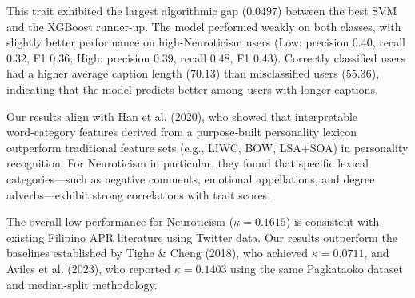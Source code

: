 This trait exhibited the largest algorithmic gap ($0.0497$) between the best SVM 
and the XGBoost runner-up. The model performed weakly on both classes, with slightly better performance on high-Neuroticism users (Low: precision 0.40, recall 0.32, F1 0.36; High: precision 0.39, recall 0.48, F1 0.43).
Correctly classified users had a higher average caption length ($70.13$) than 
misclassified users ($55.36$), indicating that the model predicts better among users with longer captions. 

Our results align with Han et al. (2020), who showed that interpretable word‑category features derived from a purpose‑built personality lexicon outperform traditional feature sets (e.g., LIWC, BOW, LSA+SOA) in personality recognition. For Neuroticism in particular, they found that specific lexical categories—such as negative comments, emotional appellations, and degree adverbs—exhibit strong correlations with trait scores.  
The overall low performance for Neuroticism ($\kappa = 0.1615$) is consistent with 
existing Filipino APR literature using Twitter data. Our results outperform the 
baselines established by Tighe \& Cheng (2018), who achieved $\kappa = 0.0711$, 
and Aviles et al. (2023), who reported $\kappa = 0.1403$ using the same Pagkataoko 
dataset and median-split methodology. 

